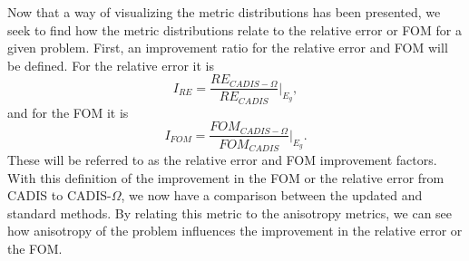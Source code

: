 Now that a way of visualizing the metric distributions has been presented,
we seek to find
how the metric distributions relate to the relative error or FOM for a given
problem. First, an improvement ratio for the relative error and FOM will be
defined. For the relative error it is
\begin{equation}
  I_{RE} = \frac{RE_{CADIS-\Omega}}{RE_{CADIS}}\bigg\rvert_{E_g},
  \label{eq:I-RE}
\end{equation}
and for the FOM it is
\begin{equation}
  I_{FOM} = \frac{FOM_{CADIS-\Omega}}{FOM_{CADIS}}\bigg\rvert_{E_g}.
  \label{eq:I-FOM}
\end{equation}
These will be referred to as the relative error and FOM
improvement factors.
With this definition of the improvement in the FOM or the relative
error from CADIS to CADIS-$\Omega$, we now have a comparison between the updated
and standard methods. By relating this metric to the anisotropy metrics, we can
see how anisotropy of the problem influences the improvement in the relative
error or the FOM.



